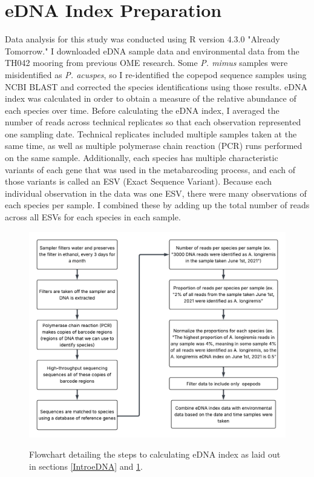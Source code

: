 \documentclass[12pt,twoside]{reedthesis}
\begin{document}
	\section{eDNA Index Preparation}\label{MethodseDNA}
	Data analysis for this study was conducted using R version 4.3.0 "Already Tomorrow." I downloaded eDNA sample data and environmental data from the TH042 mooring from previous OME research. Some \textit{P. mimus} samples were misidentified as \textit{P. acuspes}, so I re-identified the copepod sequence samples using NCBI BLAST and corrected the species identifications using those results. eDNA index was calculated in order to obtain a measure of the relative abundance of each species over time. Before calculating the eDNA index, I averaged the number of reads across technical replicates so that each observation represented one sampling date. Technical replicates included multiple samples taken at the same time, as well as multiple polymerase chain reaction (PCR) runs performed on the same sample. Additionally, each species has multiple characteristic variants of each gene that was used in the metabarcoding process, and each of those variants is called an ESV (Exact Sequence Variant). Because each individual observation in the data was one ESV, there were many observations of each species per sample. I combined these by adding up the total number of reads across all ESVs for each species in each sample. 
	
	\begin{figure}[!h]
		\begin{center}
			\includegraphics[scale=0.7]{Fig_MethodsFlowchart} \\
			\caption[Methods]{Flowchart detailing the steps to calculating eDNA index as laid out in sections \ref{IntroeDNA} and \ref{MethodseDNA}.} %
			\label{Flowchart}
		\end{center}
	\end{figure} 
	
\end{document}

